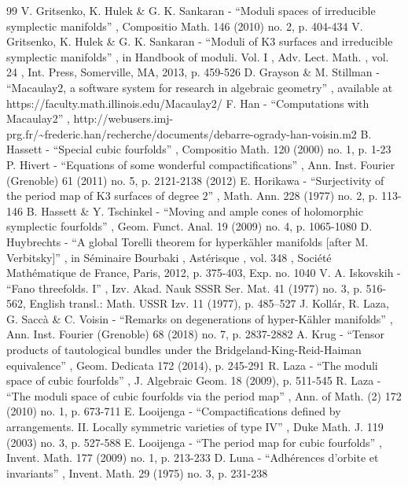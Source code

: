 \documentclass[11pt]{article}
\begin{document}
\begin{thebibliography}{99}
 V. Gritsenko, K. Hulek \& G. K. Sankaran - “Moduli spaces of irreducible symplectic manifolds” , Compositio Math. 146 (2010) no. 2, p. 404-434
 V. Gritsenko, K. Hulek \& G. K. Sankaran - “Moduli of K3 surfaces and irreducible symplectic manifolds” , in Handbook of moduli. Vol. I , Adv. Lect. Math. , vol. 24 , Int. Press, Somerville, MA, 2013, p. 459-526
 D. Grayson \& M. Stillman - “Macaulay2, a software system for research in algebraic geometry” , available at https://faculty.math.illinois.edu/Macaulay2/
 F. Han - “Computations with Macaulay2” , http://webusers.imj-prg.fr/\textasciitilde{}frederic.han/recherche/documents/debarre-ogrady-han-voisin.m2
 B. Hassett - “Special cubic fourfolds” , Compositio Math. 120 (2000) no. 1, p. 1-23
 P. Hivert - “Equations of some wonderful compactifications” , Ann. Inst. Fourier (Grenoble) 61 (2011) no. 5, p. 2121-2138 (2012)
 E. Horikawa - “Surjectivity of the period map of K3 surfaces of degree $2$” , Math. Ann. 228 (1977) no. 2, p. 113-146
 B. Hassett \& Y. Tschinkel - “Moving and ample cones of holomorphic symplectic fourfolds” , Geom. Funct. Anal. 19 (2009) no. 4, p. 1065-1080
 D. Huybrechts - “A global Torelli theorem for hyperkähler manifolds [after M. Verbitsky]” , in Séminaire Bourbaki , Astérisque , vol. 348 , Société Mathématique de France, Paris, 2012, p. 375-403, Exp. no. 1040
 V. A. Iskovskih - “Fano threefolds. I” , Izv. Akad. Nauk SSSR Ser. Mat. 41 (1977) no. 3, p. 516-562, English transl.: Math. USSR Izv. 11 (1977), p. 485–527
 J. Kollár, R. Laza, G. Saccà \& C. Voisin - “Remarks on degenerations of hyper-Kähler manifolds” , Ann. Inst. Fourier (Grenoble) 68 (2018) no. 7, p. 2837-2882
 A. Krug - “Tensor products of tautological bundles under the Bridgeland-King-Reid-Haiman equivalence” , Geom. Dedicata 172 (2014), p. 245-291
 R. Laza - “The moduli space of cubic fourfolds” , J. Algebraic Geom. 18 (2009), p. 511-545
 R. Laza - “The moduli space of cubic fourfolds via the period map” , Ann. of Math. (2) 172 (2010) no. 1, p. 673-711
 E. Looijenga - “Compactifications defined by arrangements. II. Locally symmetric varieties of type IV” , Duke Math. J. 119 (2003) no. 3, p. 527-588
 E. Looijenga - “The period map for cubic fourfolds” , Invent. Math. 177 (2009) no. 1, p. 213-233
 D. Luna - “Adhérences d’orbite et invariants” , Invent. Math. 29 (1975) no. 3, p. 231-238

\end{thebibliography}
\end{document}
